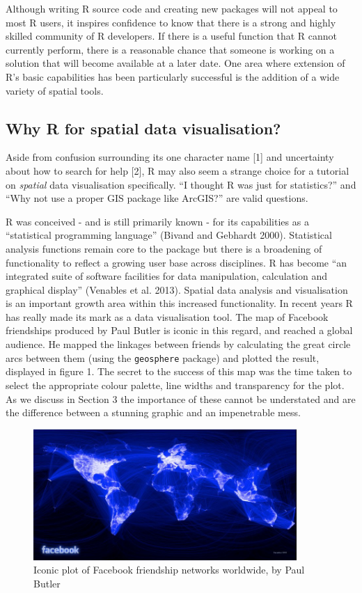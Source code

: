 \documentclass[]{article}
\let\Oldincludegraphics\includegraphics
\renewcommand{\includegraphics}[1]{\Oldincludegraphics[width=10cm]{#1}}
\begin{document}
Although writing R source code and creating new packages will not appeal
to most R users, it inspires confidence to know that there is a strong
and highly skilled community of R developers. If there is a useful
function that R cannot currently perform, there is a reasonable chance
that someone is working on a solution that will become available at a
later date. One area where extension of R's basic capabilities has been
particularly successful is the addition of a wide variety of spatial
tools.

\subsection{Why R for spatial data visualisation?}

Aside from confusion surrounding its one character name {[}1{]} and
uncertainty about how to search for help {[}2{]}, R may also seem a
strange choice for a tutorial on \emph{spatial} data visualisation
specifically. ``I thought R was just for statistics?'' and ``Why not use
a proper GIS package like ArcGIS?'' are valid questions.

R was conceived - and is still primarily known - for its capabilities as
a ``statistical programming language'' (Bivand and Gebhardt 2000).
Statistical analysis functions remain core to the package but there is a
broadening of functionality to reflect a growing user base across
disciplines. R has become ``an integrated suite of software facilities
for data manipulation, calculation and graphical display'' (Venables et
al. 2013). Spatial data analysis and visualisation is an important
growth area within this increased functionality. In recent years R has
really made its mark as a data visualisation tool. The map of Facebook
friendships produced by Paul Butler is iconic in this regard, and
reached a global audience. He mapped the linkages between friends by
calculating the great circle arcs between them (using the
\texttt{geosphere} package) and plotted the result, displayed in figure
1. The secret to the success of this map was the time taken to select
the appropriate colour palette, line widths and transparency for the
plot. As we discuss in Section 3 the importance of these cannot be
understated and are the difference between a stunning graphic and an
impenetrable mess.

\begin{figure}[htbp]
\centering
\includegraphics{figure/butler_facebook_2.jpg}
\caption{Iconic plot of Facebook friendship networks worldwide, by Paul
Butler}
\end{figure}
\end{document}
